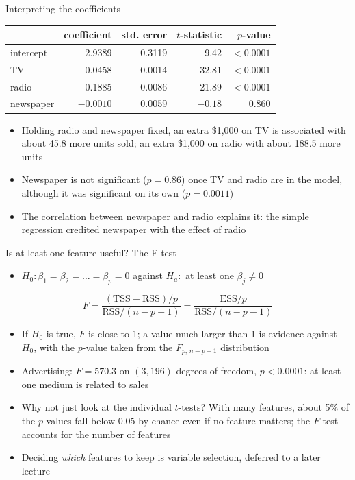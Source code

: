 \begin{frame}{Interpreting the coefficients}
    \begin{center}
        \small
        \begin{tabular}{lrrrr}
            \toprule
            & coefficient & std. error & $t$-statistic & $p$-value \\
            \midrule
            intercept & 2.9389 & 0.3119 & 9.42 & $<0.0001$ \\
            TV & 0.0458 & 0.0014 & 32.81 & $<0.0001$ \\
            radio & 0.1885 & 0.0086 & 21.89 & $<0.0001$ \\
            newspaper & $-0.0010$ & 0.0059 & $-0.18$ & 0.860 \\
            \bottomrule
        \end{tabular}
    \end{center}
    \begin{itemize}
        \item Holding radio and newspaper fixed, an extra \$1,000 on TV is associated with about 45.8 more units sold; an extra \$1,000 on radio with about 188.5 more units
        \item Newspaper is not significant ($p = 0.86$) once TV and radio are in the model, although it was significant on its own ($p = 0.0011$)
        \item The correlation between newspaper and radio explains it: the simple regression credited newspaper with the effect of radio
    \end{itemize}
\end{frame}


\begin{frame}{Is at least one feature useful? The F-test}
    \begin{itemize}
        \item $H_0\colon \beta_1 = \beta_2 = \dots = \beta_p = 0$ against $H_a\colon$ at least one $\beta_j \neq 0$
    \end{itemize}
    \[
        F = \frac{(\mathrm{TSS} - \mathrm{RSS})/p}{\mathrm{RSS}/(n-p-1)} = \frac{\mathrm{ESS}/p}{\mathrm{RSS}/(n-p-1)}
    \]
    \begin{itemize}
        \item If $H_0$ is true, $F$ is close to 1; a value much larger than 1 is evidence against $H_0$, with the $p$-value taken from the $F_{p,\,n-p-1}$ distribution
        \item Advertising: $F = 570.3$ on $(3, 196)$ degrees of freedom, $p < 0.0001$: at least one medium is related to sales
        \item Why not just look at the individual $t$-tests? With many features, about 5\% of the $p$-values fall below 0.05 by chance even if no feature matters; the $F$-test accounts for the number of features
        \item Deciding \emph{which} features to keep is variable selection, deferred to a later lecture
    \end{itemize}
\end{frame}


